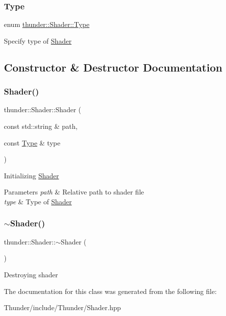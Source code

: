 \subsubsection{\texorpdfstring{Type}{Type}}
{\footnotesize\ttfamily enum \mbox{\hyperlink{classthunder_1_1_shader_a813fdb14b81f9dbb161c3e8deccb28f6}{thunder\+::\+Shader\+::\+Type}}}

Specify type of \mbox{\hyperlink{classthunder_1_1_shader}{Shader}} 

\subsection{Constructor \& Destructor Documentation}
\mbox{\label{classthunder_1_1_shader_ad79fcbdab7b64ba8626771b7b1800cb8}} 
\subsubsection{\texorpdfstring{Shader()}{Shader()}}
{\footnotesize\ttfamily thunder\+::\+Shader\+::\+Shader (\begin{DoxyParamCaption}\item[{const std\+::string \&}]{path,  }\item[{const \mbox{\hyperlink{classthunder_1_1_shader_a813fdb14b81f9dbb161c3e8deccb28f6}{Type}} \&}]{type }\end{DoxyParamCaption})}

Initializing \mbox{\hyperlink{classthunder_1_1_shader}{Shader}} 
\begin{DoxyParams}{Parameters}
{\em path} & Relative path to shader file \\
\hline
{\em type} & Type of \mbox{\hyperlink{classthunder_1_1_shader}{Shader}} \\
\hline
\end{DoxyParams}
\mbox{\label{classthunder_1_1_shader_a866c0215ed5d2cd015349c1a0850671c}} 
\subsubsection{\texorpdfstring{$\sim$\+Shader()}{~Shader()}}
{\footnotesize\ttfamily thunder\+::\+Shader\+::$\sim$\+Shader (\begin{DoxyParamCaption}{ }\end{DoxyParamCaption})}

Destroying shader 

The documentation for this class was generated from the following file\+:\begin{DoxyCompactItemize}
\item 
Thunder/include/\+Thunder/Shader.\+hpp\end{DoxyCompactItemize}
